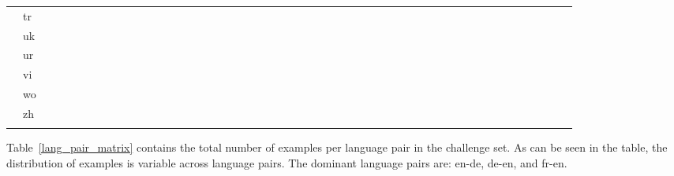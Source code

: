\documentclass[11pt]{article}
\begin{document}
\begin{sidewaystable*}[]
\begin{tabular}{ll|c|c|c|c|c|c|c|c|c|c|c|c|c|c|c|c|c|c|c|c|c|c|c|c|c|c|c|c|c|c|c|c|c|c|c|c|c|c|c|c|c|c|c|c|c|c|c|c|}
\hhline{~~------------------------------------------------}
 & tr &  &  &  &  &  &  &  &  &  & \cellcolor{red!25}{386} &  &  &  &  &  &  &  &  &  &  &  &  &  &  &  &  &  &  &  &  &  &  &  &  &  &  &  &  &  &  &  &  &  &  &  &  &  & \\
\hhline{~~------------------------------------------------}
 & uk &  &  &  &  &  &  &  &  &  & \cellcolor{red!10}{77} &  &  &  &  &  &  &  &  &  &  &  &  &  &  &  &  &  &  &  &  &  &  &  &  &  &  &  &  &  &  &  &  &  &  &  &  &  & \\
\hhline{~~------------------------------------------------}
 & ur &  &  &  &  &  &  &  &  &  & \cellcolor{red!25}{372} &  &  &  &  &  &  &  &  &  &  &  &  &  &  &  &  &  &  &  &  &  &  &  &  &  &  &  &  &  &  &  &  &  &  &  &  &  & \\
\hhline{~~------------------------------------------------}
 & vi &  &  &  &  &  &  &  &  &  & \cellcolor{red!25}{391} &  &  &  &  &  &  &  &  &  &  &  & \cellcolor{red!10}{3} &  &  &  &  &  &  &  &  &  &  &  &  &  &  &  &  &  &  &  &  &  &  &  &  &  & \\
\hhline{~~------------------------------------------------}
 & wo &  &  &  &  &  &  &  &  &  & \cellcolor{red!10}{11} &  &  &  &  &  &  &  &  &  &  &  &  &  &  &  &  &  &  &  &  &  &  &  &  &  &  &  &  &  &  &  &  &  &  &  &  &  & \\
\hhline{~~------------------------------------------------}
 & zh &  &  &  &  &  &  &  & \cellcolor{red!25}{150} &  & \cellcolor{red!40}{1209} & \cellcolor{red!10}{59} &  &  &  & \cellcolor{red!25}{113} &  &  &  &  &  &  &  &  &  & \cellcolor{red!25}{128} & \cellcolor{red!10}{80} &  &  &  &  &  &  &  &  &  &  &  &  &  &  &  &  &  &  &  &  &  & \\
\hhline{~~------------------------------------------------}
\end{tabular}
\caption{Number of examples per language pair. Rows: source language; Columns: target language}
\label{lang_pair_matrix}
\end{sidewaystable*}

%
 Table~\ref{lang_pair_matrix} contains the total number of examples per language pair in the challenge set. As can be seen in the table, the distribution of examples is variable across language pairs. The dominant language pairs are: en-de, de-en, and fr-en.
\end{document}
